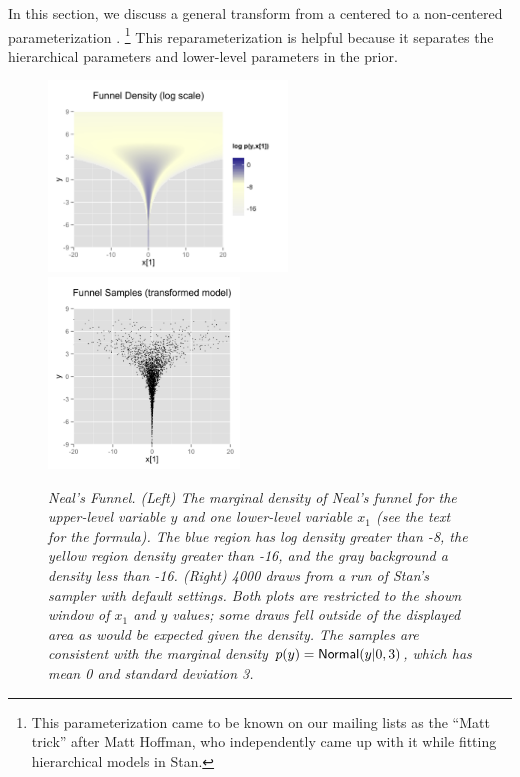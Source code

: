 In this section, we discuss a general transform from a centered to a
non-centered parameterization \cite{papa-et-al:2007}.%
%
\footnote{This parameterization came to be known on our mailing lists
  as the ``Matt trick'' after Matt Hoffman, who independently came up
  with it while fitting hierarchical models in Stan.}
%
This reparameterization is helpful because it separates the
hierarchical parameters and lower-level parameters in the prior.
%
\begin{figure}[t]
\vspace*{-6pt}
\begin{center}
\includegraphics[height=2in]{img/funnel.png}
\includegraphics[height=2in]{img/funnel-fit.png}
\end{center}
\vspace*{-18pt}
\caption{\small\it Neal's Funnel.  (Left) The marginal density of
  Neal's funnel for the upper-level variable $y$ and one lower-level
  variable $x_1$ (see the text for the formula).  The blue region has
  log density greater than -8, the yellow region density greater than
  -16, and the gray background a density less than -16.  
  (Right) 4000 draws from a run of Stan's
  sampler with default settings.  Both plots are restricted to the
  shown window of $x_1$ and $y$ values; some draws fell outside of
  the displayed area as would be expected given the density.  The samples are
  consistent with the marginal density $p(y) =
  \distro{Normal}(y|0,3)$, which has mean 0 and standard deviation
  3.}\label{funnel.figure}
\end{figure}

